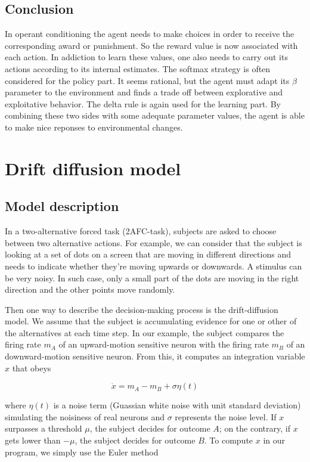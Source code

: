 \subsection{Conclusion}

In operant conditioning the agent needs to make choices in order to receive 
the corresponding award or punishment. So the reward value is now associated 
with each action. In addiction to learn these values, one also needs to carry
out its actions according to its internal estimates. The softmax strategy is 
often considered for the policy part. It seems rational, but the agent must 
adapt its $\beta$ parameter to the environment and finds a trade off between 
explorative and exploitative behavior. The delta rule is again used for the 
learning part. By combining these two sides with some adequate parameter 
values, the agent is able to make nice reponses to environmental changes.


\section{Drift diffusion model}

\subsection{Model description}

In a two-alternative forced task (2AFC-task), subjects are asked to choose
between two alternative actions. For example, we can consider that the subject
is looking at a set of dots on a screen that are moving in different
directions and needs to indicate whether they're moving upwards or downwards.
A stimulus can be very noisy. In such case, only a small part of the dots
are moving in the right direction and the other points move randomly. 

Then one way to describe the decision-making process is the drift-diffusion
model. We assume that the subject is accumulating evidence for one or other of
the alternatives at each time step. In our example, the subject compares the
firing rate $m_A$ of an upward-motion sensitive neuron with the firing rate 
$m_B$ of an downward-motion sensitive neuron. From this, it computes an
integration variable $x$ that obeys 

\[\dot{x} = m_A - m_B + \sigma\eta(t)\]

\noindent
where $\eta(t)$ is a noise term (Guassian white noise with unit standard
deviation) simulating the noisiness of real neurons and $\sigma$ represents 
the noise level. If $x$ surpasses a threshold $\mu$, the subject decides for 
outcome $A$; on the contrary, if $x$ gets lower than $-\mu$, the subject 
decides for outcome $B$. To compute  $x$ in our program, we simply use the 
Euler method 

